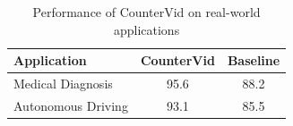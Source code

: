 \documentclass{article}
\begin{document}
\begin{table}[h]
\centering
\begin{tabular}{|l|c|c|}
\hline
Application & CounterVid & Baseline \\
\hline
Medical Diagnosis & 95.6 & 88.2 \\
\hline
Autonomous Driving & 93.1 & 85.5 \\
\hline
\end{tabular}
\caption{Performance of CounterVid on real-world applications}
\label{table:applications}
\end{table}
\end{document}
